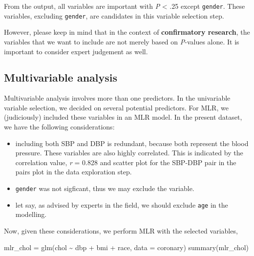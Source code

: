 \documentclass[
  10pt,
]{krantz}
\newenvironment{Shaded}{\begin{snugshade}}{\end{snugshade}}
\newcommand{\AttributeTok}[1]{\textcolor[rgb]{0.77,0.63,0.00}{#1}}
\newcommand{\FunctionTok}[1]{\textcolor[rgb]{0.00,0.00,0.00}{#1}}
\newcommand{\NormalTok}[1]{#1}
\newcommand{\OtherTok}[1]{\textcolor[rgb]{0.56,0.35,0.01}{#1}}
\newcommand{\SpecialCharTok}[1]{\textcolor[rgb]{0.00,0.00,0.00}{#1}}
\providecommand{\tightlist}{%
  \setlength{\itemsep}{0pt}\setlength{\parskip}{0pt}}
\begin{document}
From the output, all variables are important with \emph{P} \textless{} .25 except \texttt{gender}. These variables, excluding \texttt{gender}, are candidates in this variable selection step.

However, please keep in mind that in the context of \textbf{confirmatory research}, the variables that we want to include are not merely based on \emph{P}-values alone. It is important to consider expert judgement as well.

\hypertarget{multivariable-analysis}{%
\subsection{Multivariable analysis}\label{multivariable-analysis}}

Multivariable analysis involves more than one predictors. In the univariable variable selection, we decided on several potential predictors. For MLR, we (judiciously) included these variables in an MLR model. In the present dataset, we have the following considerations:

\begin{itemize}
\tightlist
\item
  including both SBP and DBP is redundant, because both represent the blood pressure. These variables are also highly correlated. This is indicated by the correlation value, \emph{r} = 0.828 and scatter plot for the SBP-DBP pair in the pairs plot in the data exploration step.
\item
  \texttt{gender} was not sigficant, thus we may exclude the variable.
\item
  let say, as advised by experts in the field, we should exclude \texttt{age} in the modelling.
\end{itemize}

Now, given these considerations, we perform MLR with the selected variables,

\begin{Shaded}
\begin{Highlighting}[]
\NormalTok{mlr\_chol }\OtherTok{=} \FunctionTok{glm}\NormalTok{(chol }\SpecialCharTok{\textasciitilde{}}\NormalTok{ dbp }\SpecialCharTok{+}\NormalTok{ bmi }\SpecialCharTok{+}\NormalTok{ race, }\AttributeTok{data =}\NormalTok{ coronary)}
\FunctionTok{summary}\NormalTok{(mlr\_chol)}
\end{Highlighting}
\end{Shaded}
\end{document}
